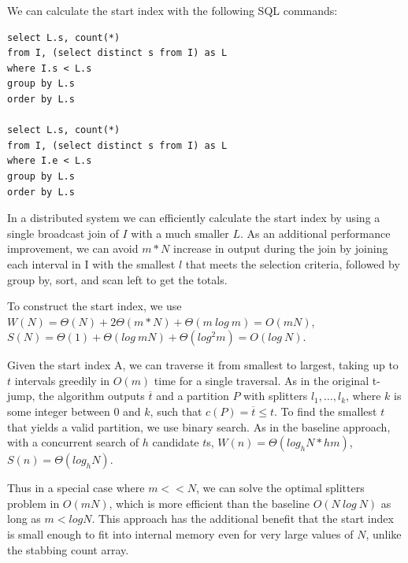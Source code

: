 We can calculate the start index with the following SQL commands:

\begin{small}
\begin{verbatim}
select L.s, count(*)
from I, (select distinct s from I) as L
where I.s < L.s
group by L.s
order by L.s

select L.s, count(*)
from I, (select distinct s from I) as L
where I.e < L.s
group by L.s
order by L.s
\end{verbatim}
\end{small}

In a distributed system we can efficiently calculate the start index
by using a single broadcast join of $I$ with a much smaller $L$.  As
an additional performance improvement, we can avoid $m*N$ increase in
output during the join by joining each interval in I with the smallest
$l$ that meets the selection criteria, followed by group by, sort, and
scan left to get the totals.

To construct the start index, we use $W(N) = \Theta(N) + 2\Theta(m*N)
+ \Theta(m~log~m) = O(mN)$, $S(N) = \Theta(1) + \Theta(log~mN) +
\Theta(log^2 m) = O(log~N)$.

Given the start index A, we can traverse it from smallest to largest,
taking up to $t$ intervals greedily in $O(m)$ time for a single
traversal.  As in the original t-jump, the algorithm outputs
$\overline{t}$ and a partition $P$ with splitters $l_1, \ldots, l_k$,
where $k$ is some integer between 0 and $k$, such that $c(P) =
\overline{t} \leq t$.  To find the smallest $t$ that yields a valid
partition, we use binary search.  As in the baseline approach, with a
concurrent search of $h$ candidate $t$s, $W(n) = \Theta(log_hN*hm)$,
$S(n) = \Theta(log_hN)$.

Thus in a special case where $m << N$, we can solve the optimal
splitters problem in $O(mN)$, which is more efficient than the
baseline $O(N~log~N)$ as long as $m < log N$.  This approach has the
additional benefit that the start index is small enough to fit into
internal memory even for very large values of $N$, unlike the stabbing
count array.
